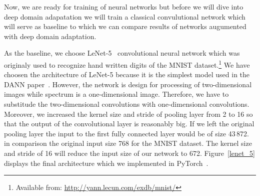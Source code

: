 Now, we are ready for training of neural networks
but before we will dive into deep domain adapatation
we will train a classical convulutional network
which will serve as baseline to
which we can compare results of networks augumented with deep domain adaptation.

As the baseline, we choose LeNet-5~\cite{lecun1998} convolutional neural network
which was originaly used to recognize hand written digits
of the MNIST dataset.\footnote{Available from: \url{http://yann.lecun.com/exdb/mnist/}}
We have choosen the architecture of LeNet-5
because it is the simplest model used in the DANN paper~\cite{ganin2016}.
However, the network is design for processing of two-dimensional images
while spectrum is a one-dimensional image.
Therefore, we have to substitude the two-dimensional convolutions with one-dimensional convolutions.
Moreover, we increased the kernel size and stride of pooling layer from 2 to 16
so that the output of the convolutional layer is reasonably big.
If we left the original pooling layer
the input to the first fully connected layer would be of size 43\,872.
in comparison the original input size 768 for the MNIST dataset.
The kernel size and stride of 16 will reduce the input size of our network to 672.
Figure~\ref{lenet_5} displays the final architecture
which we implemented in PyTorch~\cite{paszke2019}.

